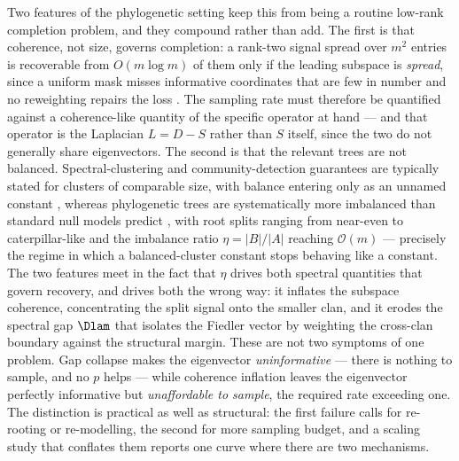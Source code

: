 Two features of the phylogenetic setting keep this from being a routine
low-rank completion problem, and they compound rather than add. The first is
that coherence, not size, governs completion: a rank-two signal spread over
$m^2$ entries is recoverable from $O(m\log m)$ of them only if the leading
subspace is \emph{spread}, since a uniform mask misses informative
coordinates that are few in number and no reweighting repairs the loss
\cite{candes2009power, recht2011simpler, chen2014completing}. The sampling
rate must therefore be quantified against a coherence-like quantity of the
specific operator at hand --- and that operator is the Laplacian $L=D-S$
rather than $S$ itself, since the two do not generally share eigenvectors.
The second is that the relevant trees are not balanced. Spectral-clustering
and community-detection guarantees are typically stated for clusters of
comparable size, with balance entering only as an unnamed constant
\cite{Balakrishnan2011clustering, qinrohe2013regularized}, whereas
phylogenetic trees are systematically more imbalanced than standard null
models predict \cite{blum2006which, aldous2001stochastic}, with root splits
ranging from near-even to caterpillar-like and the imbalance ratio
$\eta=|B|/|A|$ reaching $\mathcal O(m)$ --- precisely the regime in which a
balanced-cluster constant stops behaving like a constant. The two features
meet in the fact that $\eta$ drives both spectral quantities that govern
recovery, and drives both the wrong way: it inflates the subspace coherence,
concentrating the split signal onto the smaller clan, and it erodes the
spectral gap $\Dlam$ that isolates the Fiedler vector by weighting the
cross-clan boundary against the structural margin. These are not two
symptoms of one problem. Gap collapse makes the eigenvector
\emph{uninformative} --- there is nothing to sample, and no $p$ helps ---
while coherence inflation leaves the eigenvector perfectly informative but
\emph{unaffordable to sample}, the required rate exceeding one. The
distinction is practical as well as structural: the first failure calls for
re-rooting or re-modelling, the second for more sampling budget, and a
scaling study that conflates them reports one curve where there are two
mechanisms.

